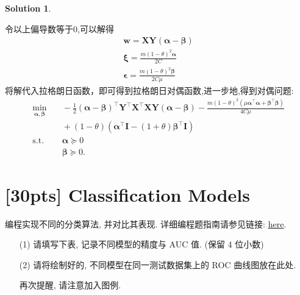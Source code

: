 \documentclass[a4paper,UTF8]{article}
\numberwithin{equation}{section}
\theoremstyle{definition}
\newtheorem*{solution}{Solution}
\def \X {\boldsymbol{X}}
\def \Y {\boldsymbol{Y}}
\def \bdalpha {\boldsymbol{\alpha}}
\def \bdbeta {\boldsymbol{\beta}}
\begin{document}
\begin{solution}
\begin{enumerate}
        令以上偏导数等于0,可以解得
        \begin{align*} 
            \boldsymbol {w}= \boldsymbol {X}\boldsymbol {Y}(\boldsymbol {\alpha }- \boldsymbol {\beta })\\ \boldsymbol {\xi }= \frac{m (1 - \theta)^2 \boldsymbol {\alpha }}{2 C }\\ \boldsymbol {\epsilon }= \frac{m (1 - \theta)^2 \boldsymbol {\beta }}{2 C \mu }
        \end{align*}
        将解代入拉格朗日函数，即可得到拉格朗日对偶函数,进一步地,得到对偶问题:
        \begin{align*}
            \min_{\bdalpha, \bdbeta} & \quad  - \frac{1}{2} (\boldsymbol {\alpha }- \boldsymbol {\beta })^\top \Y^\top \X^\top \X\Y (\boldsymbol {\alpha }- \boldsymbol {\beta }) - \frac{m (1 - \theta)^2 (\mu \boldsymbol {\alpha }^\top \boldsymbol {\alpha }+ \boldsymbol {\beta }^\top \boldsymbol {\beta })}{4 C \mu }\\ &\quad + (1 - \theta) (\boldsymbol {\alpha }^\top \mathbf{I}- (1 + \theta) \boldsymbol {\beta }^\top \mathbf{I}) \\
            \text{s.t.} & \quad \bdalpha \succeq 0 \\
            & \quad \bdbeta \succeq 0.
        \end{align*}
	\end{enumerate}
\end{solution}

\newpage

\section{[30pts] Classification Models}
编程实现不同的分类算法, 并对比其表现. 详细编程题指南请参见链接: \href{https://www.lamda.nju.edu.cn/ML2023Spring/homework/hw3/hw3-code.html}{here}.
\begin{enumerate}
    \item[(1)] 请填写下表, 记录不同模型的精度与 AUC 值. (保留 4 位小数)
    \item[(2)] 请将绘制好的, 不同模型在同一测试数据集上的 ROC 曲线图放在此处. 
	
	再次提醒, 请注意加入图例.
\end{enumerate}
\end{document}
